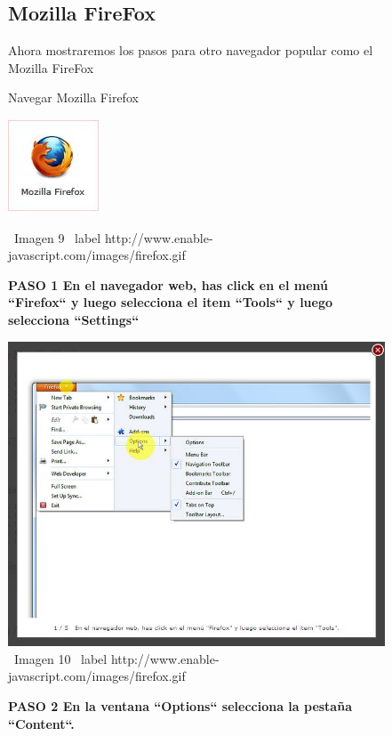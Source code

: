 \documentclass[11pt]{article} %
\begin{document}
\begin{figure}
\subsection{Mozilla FireFox}

Ahora mostraremos los pasos para otro navegador popular como el Mozilla FireFox
\begin{center}
\begin{center}
Navegar Mozilla Firefox

\end{center}
\begin{center}
\includegraphics[height=3 cm, width=3 cm] {imagenes/firefox.jpg}
\end{center}


\ Imagen 9
\ label {http://www.enable-javascript.com/images/firefox.gif }

\begin{center}
\bf PASO 1 
En el navegador web, has click en el menú ``Firefox`` y luego selecciona el item ``Tools``
y luego selecciona ``Settings``
\end{center}

\includegraphics[height=8 cm, width=8 cm] {imagenes/firefox 01.jpg}
\newline
\newline
\ Imagen 10
\ label {http://www.enable-javascript.com/images/firefox.gif }

\begin{center}
\bf PASO 2
En la ventana ``Options`` selecciona la pestaña ``Content``.
\end{center}


\end{center}
\end{figure}
\end{document}
